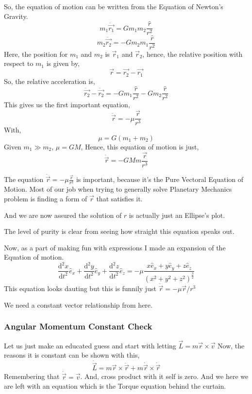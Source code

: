 \documentclass[11pt,a4paper]{article}
\begin{document}
So, the equation of motion can be written from the Equation of Newton's Gravity.
\[ 
    m_1 \ddot{\vec{r_1}} = G m_1 m_2 \frac{\hat{r}}{r^2}    
\]
\[ 
m_2 \ddot{\vec{r_2}} =- G m_2 m_1 \frac{\hat{ r}}{r^2}
\]
Here, the position for $m_1$ and $m_2$ is $\vec{r}_1$ and $\vec{r}_2$, hence, the relative position with respect to $m_1$ is given by,
\[ 
    \vec{r} = \vec{r_2} - \vec{r_1} 
\]
So, the relative acceleration is,
\[ 
\ddot{\vec{r_2}} - \ddot{\vec{r_2}}= -G m_1 \frac{\hat{ r}}{r^2}  - G m_2 \frac{\hat{ r}}{r^2}
\]
This gives us the first important equation,
\[ 
\boxed{ \ddot{\vec{r}}  = - \mu \frac{\vec{r}}{r^3}}
\]
With, 
\[ 
    \mu = G\left( m_1 + m_2 \right) 
\]
Given $m_1 \gg m_2$, $\mu = GM$,
Hence, this equation of motion is just,
\[ 
\boxed{ \ddot{\vec{r}} = -GMm \frac{\vec{r}}{r^3} }
\]


The equation $ \ddot{\vec{r}} = - \mu \frac{\vec{r}}{r^3}$ is important, because it's the Pure Vectoral Equation of Motion. Most of our job when trying to generally solve Planetary Mechanics problem is finding a form of $\vec{r}$ that satisfies it.

And we are now assured the solution of $r$ is actually just an Ellipse's plot. 

The level of purity is clear from seeing how straight this equation speaks out.

Now, as a part of making fun with expressions I made an expansion of the Equation of motion.
\[ 
\frac{\mathrm{d} ^2 x}{\mathrm{d} t^2} \hat{ e} _x + 
\frac{\mathrm{d} ^2 y}{\mathrm{d} t^2} \hat{ e} _y + 
\frac{\mathrm{d} ^2 z}{\mathrm{d} t^2} \hat{ e} _z  = 
- \mu 
\frac{x \hat{e}_x + y \hat{e}_y + z \hat{e}_z}{ \left( x^2 + y^2 + z^2 \right) ^{\frac{3}{2}}}
\]
This equation looks dauting but this is funnily just $ \ddot{\vec{r}} = - \mu \vec{r}/r^3$

We need a constant vector relationship from here. 

\subsubsection{ Angular Momentum Constant Check }
Let us just make an educated guess and start with letting $\vec{L}= m \vec{r} \times  \vec{v}$
Now, the reasons it is constant can be shown with this,
\[ 
\dot{\vec{L}} = m \vec{r} \times  \ddot{\vec{r}} + 
m \dot{\vec{r}} \times  \dot{\vec{r}}
\]
Remembering that $ \dot{\vec{r}} = \vec{v}$. 
And, cross product with it self is zero. And we here we are left with an equation which is the Torque equation behind the curtain.
\end{document}
